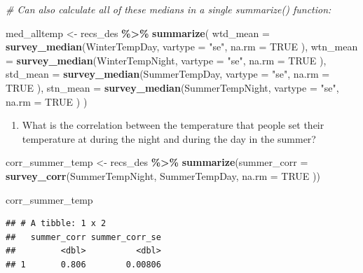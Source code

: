 \documentclass[
]{krantz}
\makeatletter
\newenvironment{Shaded}{\begin{snugshade}}{\end{snugshade}}
\newcommand{\AttributeTok}[1]{\textcolor[rgb]{0.27,0.27,0.27}{#1}}
\newcommand{\CommentTok}[1]{\textcolor[rgb]{0.37,0.37,0.37}{\textit{#1}}}
\newcommand{\ConstantTok}[1]{\textcolor[rgb]{0.37,0.37,0.37}{#1}}
\newcommand{\FunctionTok}[1]{\textcolor[rgb]{0.27,0.27,0.27}{\textbf{#1}}}
\newcommand{\NormalTok}[1]{#1}
\newcommand{\OtherTok}[1]{\textcolor[rgb]{0.37,0.37,0.37}{#1}}
\newcommand{\SpecialCharTok}[1]{\textcolor[rgb]{0.43,0.43,0.43}{\textbf{#1}}}
\newcommand{\StringTok}[1]{\textcolor[rgb]{0.5,0.5,0.5}{#1}}
\providecommand{\tightlist}{%
  \setlength{\itemsep}{0pt}\setlength{\parskip}{0pt}}
\newenvironment{kframe}{%
\medskip{}
\setlength{\fboxsep}{.8em}
 \def\at@end@of@kframe{}%
 \ifinner\ifhmode%
  \def\at@end@of@kframe{\end{minipage}}%
  \begin{minipage}{\columnwidth}%
 \fi\fi%
 \def\FrameCommand##1{\hskip\@totalleftmargin \hskip-\fboxsep
 \colorbox{shadecolor}{##1}\hskip-\fboxsep
     \hskip-\linewidth \hskip-\@totalleftmargin \hskip\columnwidth}%
 \MakeFramed {\advance\hsize-\width
   \@totalleftmargin\z@ \linewidth\hsize
   \@setminipage}}%
 {\par\unskip\endMakeFramed%
 \at@end@of@kframe}
\renewenvironment{Shaded}{\begin{kframe}}{\end{kframe}}
\makeatother
\begin{document}
\begin{Shaded}
\begin{Highlighting}[]
\CommentTok{\# Can also calculate all of these medians in a single summarize() function:}

\NormalTok{med\_alltemp }\OtherTok{\textless{}{-}}\NormalTok{ recs\_des }\SpecialCharTok{\%\textgreater{}\%}
  \FunctionTok{summarize}\NormalTok{(}
    \AttributeTok{wtd\_mean =} \FunctionTok{survey\_median}\NormalTok{(WinterTempDay,}
      \AttributeTok{vartype =} \StringTok{"se"}\NormalTok{,}
      \AttributeTok{na.rm =} \ConstantTok{TRUE}
\NormalTok{    ),}
    \AttributeTok{wtn\_mean =} \FunctionTok{survey\_median}\NormalTok{(WinterTempNight,}
      \AttributeTok{vartype =} \StringTok{"se"}\NormalTok{,}
      \AttributeTok{na.rm =} \ConstantTok{TRUE}
\NormalTok{    ),}
    \AttributeTok{std\_mean =} \FunctionTok{survey\_median}\NormalTok{(SummerTempDay,}
      \AttributeTok{vartype =} \StringTok{"se"}\NormalTok{,}
      \AttributeTok{na.rm =} \ConstantTok{TRUE}
\NormalTok{    ),}
    \AttributeTok{stn\_mean =} \FunctionTok{survey\_median}\NormalTok{(SummerTempNight,}
      \AttributeTok{vartype =} \StringTok{"se"}\NormalTok{,}
      \AttributeTok{na.rm =} \ConstantTok{TRUE}
\NormalTok{    )}
\NormalTok{  )}
\end{Highlighting}
\end{Shaded}

\begin{enumerate}
\def\labelenumi{\arabic{enumi}.}
\setcounter{enumi}{7}
\tightlist
\item
  What is the correlation between the temperature that people set their temperature at during the night and during the day in the summer?
\end{enumerate}

\begin{Shaded}
\begin{Highlighting}[]
\NormalTok{corr\_summer\_temp }\OtherTok{\textless{}{-}}\NormalTok{ recs\_des }\SpecialCharTok{\%\textgreater{}\%}
  \FunctionTok{summarize}\NormalTok{(}\AttributeTok{summer\_corr =} \FunctionTok{survey\_corr}\NormalTok{(SummerTempNight, SummerTempDay,}
    \AttributeTok{na.rm =} \ConstantTok{TRUE}
\NormalTok{  ))}

\NormalTok{corr\_summer\_temp}
\end{Highlighting}
\end{Shaded}

\begin{verbatim}
## # A tibble: 1 x 2
##   summer_corr summer_corr_se
##         <dbl>          <dbl>
## 1       0.806        0.00806
\end{verbatim}
\end{document}
